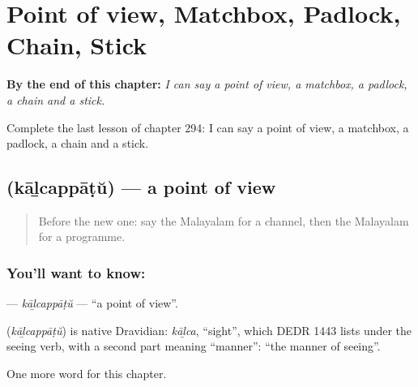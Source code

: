 
\chapter{Point of view, Matchbox, Padlock, Chain, Stick}
\label{ch:ml-point-of-view-matchbox-padlock-chain-stick}

\begin{chapteropening}
\textbf{By the end of this chapter:} \emph{I can say a point of view, a matchbox, a padlock, a chain and a stick.}

Complete the last lesson of chapter 294: I can say a point of view, a matchbox, a padlock, a chain and a stick.
\end{chapteropening}

\section[\texorpdfstring{\ml{കാഴ്ചപ്പാട്} (kāḻcappāṭŭ)}{കാഴ്ചപ്പാട് (kāḻcappāṭŭ)}]{ (kāḻcappāṭŭ) — a point of view}

\label{lesson:ML-C294-kalcappatu}



\begin{quote}
Before the new one: say the Malayalam for a channel, then the Malayalam for a programme.
\end{quote}

\subsection*{You'll want to know: }
\textbf{} — \emph{kāḻcappāṭŭ} — \textquotedblleft{}a point of view\textquotedblright{}.

\begin{cousinweb}
\textbf{} (\emph{kāḻcappāṭŭ}) is native Dravidian: \emph{kāḻca}, \textquotedblleft{}sight\textquotedblright{}, which DEDR 1443 lists under the seeing verb, with a second part meaning \textquotedblleft{}manner\textquotedblright{}: \textquotedblleft{}the manner of seeing\textquotedblright{}.
\end{cousinweb}

\begin{grammarlens}[title={What you've built}]
One more word for this chapter.
\end{grammarlens}

